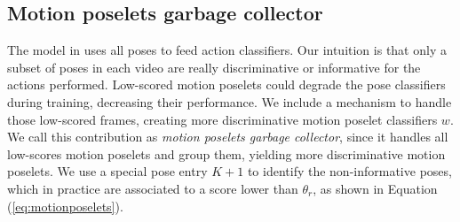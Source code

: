 \subsection{Motion poselets garbage collector}
\label{subsec:garbage_collector}
The model in \cite{Lillo2014} uses all poses to feed action classifiers. Our 
intuition is that only a subset of poses in each video are really discriminative 
or informative for the actions performed. Low-scored motion poselets could  degrade the pose classifiers during training, decreasing their performance. 
We include a mechanism to handle those low-scored 
frames, creating more discriminative motion poselet classifiers $w$. We call this contribution as \emph{motion poselets garbage collector}, since it handles all low-scores motion poselets and group them, yielding more discriminative motion poselets. We use a special pose entry $K+1$ to identify the non-informative poses, which in practice are associated to a score lower than $\theta_r$, as shown in Equation (\ref{eq:motionposelets}).





 






